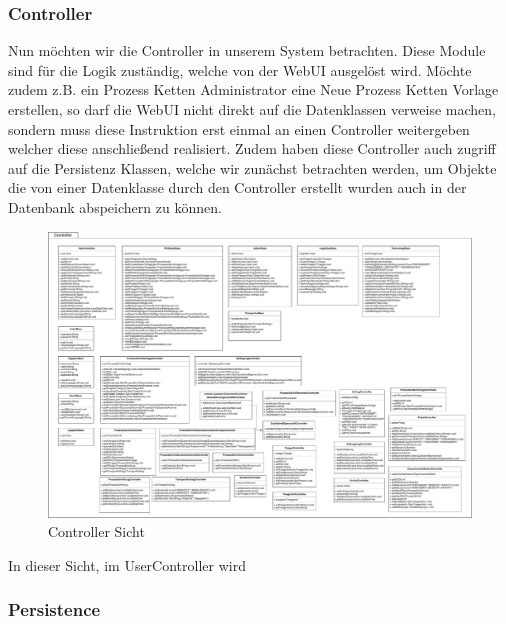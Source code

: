 \documentclass[enabledeprecatedfontcommands,fontsize=12pt,paper=a4,twoside]{scrartcl}
\begin{document}
\subsubsection{Controller}
Nun möchten wir die Controller in unserem System betrachten. Diese Module sind für die Logik zuständig, welche von der WebUI ausgelöst wird. Möchte zudem z.B. ein Prozess Ketten Administrator eine Neue Prozess Ketten Vorlage erstellen, so darf die WebUI nicht direkt auf die Datenklassen verweise machen, sondern muss diese Instruktion erst einmal an einen Controller weitergeben welcher diese anschließend realisiert. Zudem haben diese Controller auch zugriff auf die Persistenz Klassen, welche wir zunächst betrachten werden, um Objekte die von einer Datenklasse durch den Controller erstellt wurden auch in der Datenbank abspeichern zu können.   
\begin{figure} 
\begin{center}
 \includegraphics[width=\textwidth]{UML/Controller.pdf}
  \caption{Controller Sicht}
  \label{fig:boat1}
\end{center}
\end{figure}
\newpage
In dieser Sicht, im UserController wird 
\subsubsection{Persistence}
\end{document}

